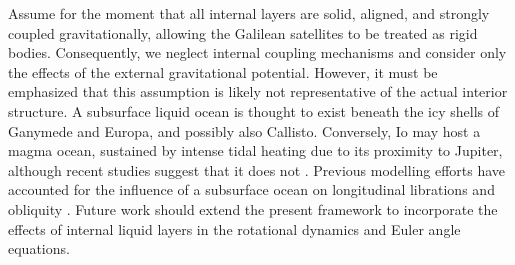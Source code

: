 \documentclass[pdflatex,sn-mathphys-num]{sn-jnl}%
\theoremstyle{thmstyleone}%
\theoremstyle{thmstyletwo}%
\theoremstyle{thmstylethree}%
\begin{document}
Assume for the moment that all internal layers are solid, aligned, and strongly coupled gravitationally, allowing the Galilean satellites to be treated as rigid bodies. Consequently, we neglect internal coupling mechanisms and consider only the effects of the external gravitational potential.
%
However, it must be emphasized that this assumption is likely not representative of the actual interior structure. A subsurface liquid ocean is thought to exist beneath the icy shells of Ganymede and Europa, and possibly also Callisto. Conversely, Io may host a magma ocean, sustained by intense tidal heating due to its proximity to Jupiter, although recent studies suggest that it does not \citep{2025Natur.638...69P}.
%
Previous modelling efforts have accounted for the influence of a subsurface ocean on longitudinal librations \citep[e.g.,][]{2010Icar..209..651B, 2011A&A...527A.118R} and obliquity \citep[e.g.,][]{Baland2012_obliquity}. 
%
Future work should extend the present framework to incorporate the effects of internal liquid layers in the rotational dynamics and Euler angle equations.
\end{document}
